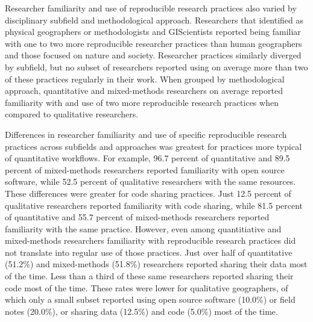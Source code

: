 \documentclass[]{interact}
\theoremstyle{plain}%
\theoremstyle{definition}
\theoremstyle{remark}
\begin{document}
Researcher familiarity and use of reproducible research practices also varied by disciplinary subfield and methodological approach. 
Researchers that identified as physical geographers or methodologists and GIScientists reported being familiar with one to two more reproducible researcher practices than human  geographers and those focused on nature and society.
Researcher practices similarly diverged by subfield, but no subset of researchers reported using on average more than two of these practices regularly in their work.  
When grouped by methodological approach, quantitative and mixed-methods researchers on average reported familiarity with and use of two more reproducible research practices when compared to qualitative researchers.

Differences in researcher familiarity and use of specific reproducible research practices across subfields and approaches was greatest for practices more typical of quantitative workflows. 
For example, 96.7 percent of quantitative and 89.5 percent of mixed-methods researchers reported familiarity with open source software, while 52.5 percent of qualitative researchers with the same resources.
These differences were greater for code sharing practices. 
Just 12.5 percent of qualitative researchers reported familiarity with code sharing, while 81.5 percent of quantitative and 55.7 percent of mixed-methods researchers reported familiarity with the same practice.
However, even among quantitiative and mixed-methods researchers familiarity with reproducible research practices did not translate into regular use of those practices.
Just over half of quantitative (51.2\%) and mixed-methods (51.8\%) researchers reported sharing their data most of the time.
Less than a third of these same researchers reported sharing their code most of the time. 
These rates were lower for qualitative geographers, of which only a small subset reported using open source software (10.0\%) or field notes (20.0\%), or sharing data (12.5\%) and code (5.0\%) most of the time.
\end{document}
